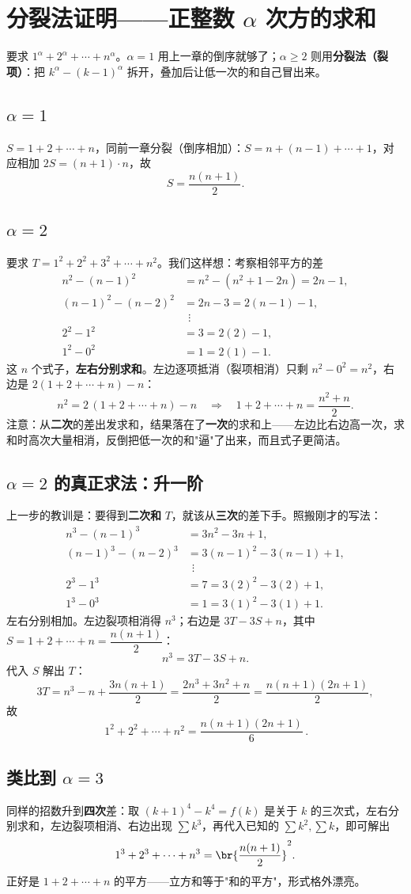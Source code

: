\chapter{分裂法证明——正整数 $\alpha$ 次方的求和}

要求 $1^\alpha+2^\alpha+\cdots+n^\alpha$。$\alpha=1$ 用上一章的倒序就够了；$\alpha\ge 2$ 则用\textbf{分裂法（裂项）}：把 $k^\alpha-(k-1)^\alpha$ 拆开，叠加后让低一次的和自己冒出来。

\section{$\alpha=1$}

$S=1+2+\cdots+n$，同前一章分裂（倒序相加）：$S=n+(n-1)+\cdots+1$，对应相加 $2S=(n+1)\cdot n$，故
\[
S=\frac{n(n+1)}{2}.
\]

\section{$\alpha=2$}

要求 $T=1^2+2^2+3^2+\cdots+n^2$。我们这样想：考察相邻平方的差
\[
\begin{aligned}
n^2-(n-1)^2&=n^2-(n^2+1-2n)=2n-1,\\
(n-1)^2-(n-2)^2&=2n-3=2(n-1)-1,\\
&\ \ \vdots\\
2^2-1^2&=3=2(2)-1,\\
1^2-0^2&=1=2(1)-1.
\end{aligned}
\]
这 $n$ 个式子，\textbf{左右分别求和}。左边逐项抵消（裂项相消）只剩 $n^2-0^2=n^2$，右边是 $2(1+2+\cdots+n)-n$：
\[
n^2=2\,(1+2+\cdots+n)-n
\quad\Longrightarrow\quad
1+2+\cdots+n=\frac{n^2+n}{2}.
\]
注意：从\textbf{二次}的差出发求和，结果落在了\textbf{一次}的求和上——左边比右边高一次，求和时高次大量相消，反倒把低一次的和"逼"了出来，而且式子更简洁。

\section{$\alpha=2$ 的真正求法：升一阶}

上一步的教训是：要得到\textbf{二次和} $T$，就该从\textbf{三次}的差下手。照搬刚才的写法：
\[
\begin{aligned}
n^3-(n-1)^3&=3n^2-3n+1,\\
(n-1)^3-(n-2)^3&=3(n-1)^2-3(n-1)+1,\\
&\ \ \vdots\\
2^3-1^3&=7=3(2)^2-3(2)+1,\\
1^3-0^3&=1=3(1)^2-3(1)+1.
\end{aligned}
\]
左右分别相加。左边裂项相消得 $n^3$；右边是 $3T-3S+n$，其中 $S=1+2+\cdots+n=\dfrac{n(n+1)}{2}$：
\[
n^3=3T-3S+n.
\]
代入 $S$ 解出 $T$：
\[
3T=n^3-n+\frac{3n(n+1)}{2}=\frac{2n^3+3n^2+n}{2}=\frac{n(n+1)(2n+1)}{2},
\]
故
\[
\boxed{\,1^2+2^2+\cdots+n^2=\frac{n(n+1)(2n+1)}{6}\,}.
\]

\section{类比到 $\alpha=3$}

同样的招数升到\textbf{四次}差：取 $(k+1)^4-k^4=f(k)$ 是关于 $k$ 的三次式，左右分别求和，左边裂项相消、右边出现 $\sum k^3$，再代入已知的 $\sum k^2,\sum k$，即可解出
\[
1^3+2^3+\cdots+n^3=\br{\frac{n(n+1)}{2}}^2.
\]
正好是 $1+2+\cdots+n$ 的平方——立方和等于"和的平方"，形式格外漂亮。
